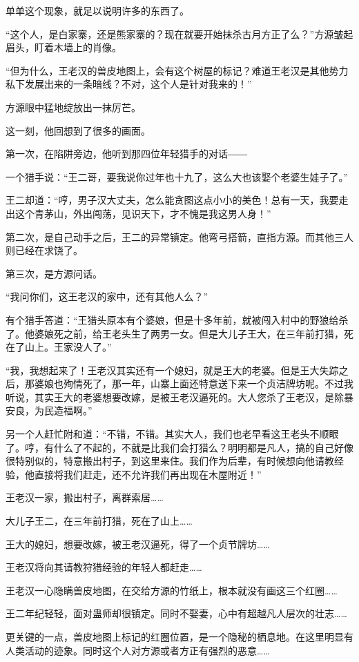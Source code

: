 \begin{this_body}
单单这个现象，就足以说明许多的东西了。

“这个人，是白家寨，还是熊家寨的？现在就要开始抹杀古月方正了么？”方源皱起眉头，盯着木墙上的肖像。

“但为什么，王老汉的兽皮地图上，会有这个树屋的标记？难道王老汉是其他势力私下发展出来的一条暗线？不对，这个人是针对我来的！”

方源眼中猛地绽放出一抹厉芒。

这一刻，他回想到了很多的画面。

第一次，在陷阱旁边，他听到那四位年轻猎手的对话――

一个猎手说：“王二哥，要我说你过年也十九了，这么大也该娶个老婆生娃子了。”

王二却道：“哼，男子汉大丈夫，怎么能贪图这点小小的美色！总有一天，我要走出这个青茅山，外出闯荡，见识天下，才不愧是我这男人身！”

第二次，是自己动手之后，王二的异常镇定。他弯弓搭箭，直指方源。而其他三人则已经在求饶了。

第三次，是方源问话。

“我问你们，这王老汉的家中，还有其他人么？”

有个猎手答道：“王猎头原本有个婆娘，但是十多年前，就被闯入村中的野狼给杀了。他婆娘死之前，给王老头生了两男一女。但是大儿子王大，在三年前打猎，死在了山上。王家没人了。”

“我，我想起来了！王老汉其实还有一个媳妇，就是王大的老婆。但是王大失踪之后，那婆娘也殉情死了，那一年，山寨上面还特意送下来一个贞洁牌坊呢。不过我听说，其实王大的老婆想要改嫁，是被王老汉逼死的。大人您杀了王老汉，是除暴安良，为民造福啊。”

另一个人赶忙附和道：“不错，不错。其实大人，我们也老早看这王老头不顺眼了。哼，有什么了不起的，不就是比我们会打猎么？明明都是凡人，搞的自己好像很特别似的，特意搬出村子，到这里来住。我们作为后辈，有时候想向他请教经验，他直接将我们赶走，还不允许我们再出现在木屋附近！”

王老汉一家，搬出村子，离群索居……

大儿子王二，在三年前打猎，死在了山上……

王大的媳妇，想要改嫁，被王老汉逼死，得了一个贞节牌坊……

王老汉将向其请教狩猎经验的年轻人都赶走……

王老汉一心隐瞒兽皮地图，在交给方源的竹纸上，根本就没有画这三个红圈……

王二年纪轻轻，面对蛊师却很镇定。同时不娶妻，心中有超越凡人层次的壮志……

更关键的一点，兽皮地图上标记的红圈位置，是一个隐秘的栖息地。在这里明显有人类活动的迹象。同时这个人对方源或者方正有强烈的恶意……


\end{this_body}

